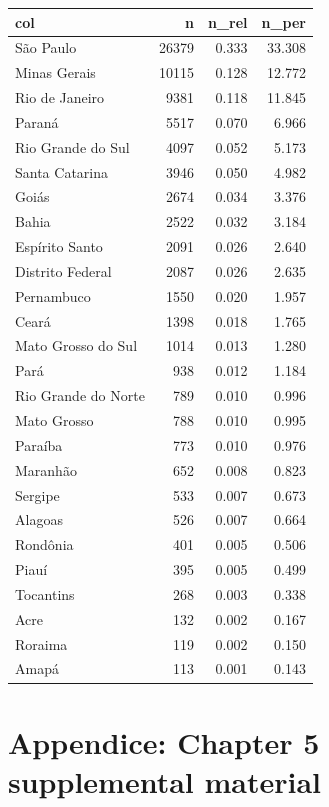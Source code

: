 \documentclass[
  12pt,
  a4paper,
  oneside]{tesesusp}
\begin{document}
\begin{table}
\centering
\begin{tabular}{l|r|r|r}
\hline
col & n & n\_rel & n\_per\\
\hline
São Paulo & 26379 & 0.333 & 33.308\\
\hline
Minas Gerais & 10115 & 0.128 & 12.772\\
\hline
Rio de Janeiro & 9381 & 0.118 & 11.845\\
\hline
Paraná & 5517 & 0.070 & 6.966\\
\hline
Rio Grande do Sul & 4097 & 0.052 & 5.173\\
\hline
Santa Catarina & 3946 & 0.050 & 4.982\\
\hline
Goiás & 2674 & 0.034 & 3.376\\
\hline
Bahia & 2522 & 0.032 & 3.184\\
\hline
Espírito Santo & 2091 & 0.026 & 2.640\\
\hline
Distrito Federal & 2087 & 0.026 & 2.635\\
\hline
Pernambuco & 1550 & 0.020 & 1.957\\
\hline
Ceará & 1398 & 0.018 & 1.765\\
\hline
Mato Grosso do Sul & 1014 & 0.013 & 1.280\\
\hline
Pará & 938 & 0.012 & 1.184\\
\hline
Rio Grande do Norte & 789 & 0.010 & 0.996\\
\hline
Mato Grosso & 788 & 0.010 & 0.995\\
\hline
Paraíba & 773 & 0.010 & 0.976\\
\hline
Maranhão & 652 & 0.008 & 0.823\\
\hline
Sergipe & 533 & 0.007 & 0.673\\
\hline
Alagoas & 526 & 0.007 & 0.664\\
\hline
Rondônia & 401 & 0.005 & 0.506\\
\hline
Piauí & 395 & 0.005 & 0.499\\
\hline
Tocantins & 268 & 0.003 & 0.338\\
\hline
Acre & 132 & 0.002 & 0.167\\
\hline
Roraima & 119 & 0.002 & 0.150\\
\hline
Amapá & 113 & 0.001 & 0.143\\
\hline
\end{tabular}
\end{table}

\hypertarget{appendice-chapter-5-supplemental-material}{%
\chapter{Appendice: Chapter 5 supplemental
material}\label{appendice-chapter-5-supplemental-material}}
\end{document}
